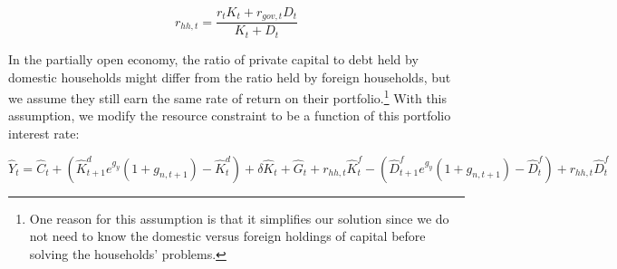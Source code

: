 \begin{equation}
  r_{hh,t} = \frac{r_{t}K_{t} + r_{gov,t}D_{t}}{K_{t} + D_{t}}
\end{equation}

In the partially open economy, the ratio of private capital to debt held by domestic households might differ from the ratio held by foreign households, but we assume they still earn the same rate of return on their portfolio.\footnote{One reason for this assumption is that it simplifies our solution since we do not need to know the domestic versus foreign holdings of capital before solving the households' problems.}  With this assumption, we modify the resource constraint to be a function of this portfolio interest rate:

\begin{equation}
  \hat{Y}_{t} = \hat{C}_{t} + (\hat{K}^{d}_{t+1}e^{g_{y}}(1+g_{n,t+1}) - \hat{K}^{d}_{t}) + \delta \hat{K}_{t} +  \hat{G}_{t} + r_{hh, t}\hat{K}^{f}_{t} - (\hat{D}^{f}_{t+1}e^{g_{y}}(1+g_{n,t+1})- \hat{D}^{f}_{t}) + r_{hh,t}\hat{D}^{f}_{t}
\end{equation}
